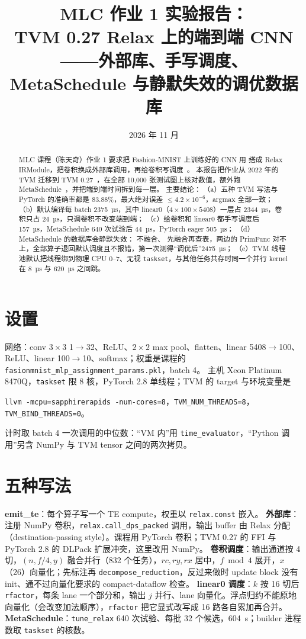 \documentclass[11pt,a4paper]{ctexart}
\title{MLC 作业 1 实验报告：\\TVM 0.27 Relax 上的端到端 CNN——外部库、手写调度、MetaSchedule 与静默失效的调优数据库}
\author{\authorline}
\date{2026 年 11 月}
\begin{document}
\maketitle

\begin{abstract}
MLC 课程（陈天奇）作业 1 要求把 Fashion-MNIST 上训练好的 CNN 用  搭成 Relax IRModule，把卷积换成外部库调用，再给卷积写调度~\cite{mlc,relax}。
本报告把作业从 2022 年的 TVM 迁移到 TVM 0.27~\cite{tvm}，在全部 10,000 张测试图上核对数值，额外跑 MetaSchedule~\cite{metaschedule}，并把端到端时间拆到每一层。
主要结论：
（a）五种 TVM 写法与 PyTorch 的准确率都是 83.88\%，最大绝对误差 $\le 4.2\times10^{-6}$，argmax 全部一致；
（b）默认编译每 batch 2375~µs，其中 linear0（$4\times100\times5408$）一层占 2344~µs，卷积只占 24~µs，只调卷积不改变端到端；
（c）给卷积和 linear0 都手写调度后 157~µs，MetaSchedule 640 次试验后 44~µs，PyTorch eager 505~µs；
（d）MetaSchedule 的数据库会静默失效： 不融合、 先融合再查表，两边的 PrimFunc 对不上，全部算子退回默认调度且不报错，第一次测得“调优后”2475~µs；
（e）TVM 线程池默认把线程绑到物理 CPU 0--7、无视 \texttt{taskset}，与其他任务共存时同一个并行 kernel 在 8~µs 与 620~µs 之间跳。
\end{abstract}

\section{设置}
网络：conv $3\times3$ 1$\to$32、ReLU、$2\times2$ max pool、flatten、linear 5408$\to$100、ReLU、linear 100$\to$10、softmax；权重是课程的 \texttt{fasionmnist\_mlp\_assignment\_params.pkl}，batch 4。
主机 Xeon Platinum 8470Q，\texttt{taskset} 限 8 核，PyTorch 2.8 单线程；TVM 的 target 与环境变量是
\begin{center}\small\texttt{llvm -mcpu=sapphirerapids -num-cores=8}，\quad \texttt{TVM\_NUM\_THREADS=8}，\quad \texttt{TVM\_BIND\_THREADS=0}。\end{center}
计时取 batch 4 一次调用的中位数：“VM 内”用 \texttt{time\_evaluator}，“Python 调用”另含 NumPy 与 TVM tensor 之间的两次拷贝。

\section{五种写法}
\textbf{emit\_te}：每个算子写一个 TE compute，权重以 \texttt{relax.const} 嵌入。
\textbf{外部库}： 注册 NumPy 卷积，\texttt{relax.call\_dps\_packed} 调用，输出 buffer 由 Relax 分配（destination-passing style）。课程用 PyTorch 卷积；TVM 0.27 的 FFI 与 PyTorch 2.8 的 DLPack 扩展冲突，这里改用 NumPy。
\textbf{卷积调度}：输出通道按 4 切，$(n, f/4, y)$ 融合并行（832 个任务），$rc, ry, rx$ 居中，$f \bmod 4$ 展开，$x$（26）向量化；先标注再 \texttt{decompose\_reduction}，反过来做时 update block 没有 init、通不过向量化要求的 compact-dataflow 检查。
\textbf{linear0 调度}：$k$ 按 16 切后 \texttt{rfactor}，每条 lane 一个部分和，输出 $j$ 并行、lane 向量化。浮点归约不能原地向量化（会改变加法顺序），\texttt{rfactor} 把它显式改写成 16 路各自累加再合并。
\textbf{MetaSchedule}：\texttt{tune\_relax} 640 次试验、每批 32 个候选，604~s；builder 进程数取 \texttt{taskset} 的核数。
\end{document}

